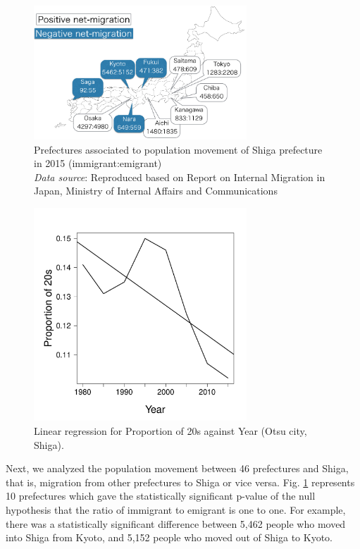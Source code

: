 \documentclass[10pt, conference, compsocconf]{IEEEtran}
\begin{document}
\begin{figure}[!h]
\begin{center}
    \includegraphics[width= 8cm]{fig/slide.png}
\caption{Prefectures associated to population movement of Shiga prefecture in 2015 (immigrant:emigrant)
\\
{\it Data source}:  Reproduced based on Report on Internal Migration in Japan, Ministry of Internal Affairs and Communications}
\label{fig29}
\end{center}
\end{figure}
\begin{figure}[!t]
\begin{center}
    \includegraphics[width= 8cm]{fig/rege2.pdf}
\caption{Linear regression for Proportion of 20s against Year (Otsu city, Shiga). }
\label{fig31}
\end{center}
\end{figure}







Next, we analyzed the population movement between 46 prefectures and Shiga, that is, migration from other prefectures to Shiga or vice versa.
 Fig. \ref{fig29} represents 10 prefectures which gave the statistically significant p-value
of the null hypothesis that
the ratio of immigrant to emigrant is one to one.
For example, there was a statistically significant difference between 5,462 people who moved into Shiga from Kyoto, and 5,152 people who moved out of Shiga to Kyoto.
\end{document}
